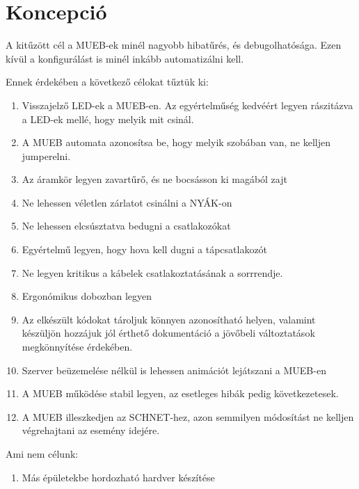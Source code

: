 \chapter{Koncepció}

A kitűzött cél a MUEB-ek minél nagyobb hibatűrés, és debugolhatósága. Ezen kívül a konfigurálást is minél inkább automatizálni kell.
\par
Ennek érdekében a következő célokat tűztük ki:
\begin{enumerate}
 \item Visszajelző LED-ek a MUEB-en. Az egyértelműség kedvéért legyen rászitázva a LED-ek mellé, hogy melyik mit csinál.
 \item A MUEB automata azonosítsa be, hogy melyik szobában van, ne kelljen jumperelni.
 \item Az áramkör legyen zavartűrő, és ne bocsásson ki magából zajt
 \item Ne lehessen véletlen zárlatot csinálni a NYÁK-on
 \item Ne lehessen elcsúsztatva bedugni a csatlakozókat
 \item Egyértelmű legyen, hogy hova kell dugni a tápcsatlakozót
 \item Ne legyen kritikus a kábelek csatlakoztatásának a sorrrendje.
 \item Ergonómikus dobozban legyen
 \item Az elkészült kódokat tároljuk könnyen azonosítható helyen, valamint készüljön hozzájuk jól érthető dokumentáció a jövőbeli változtatások megkönnyítése érdekében.
 \item Szerver beüzemelése nélkül is lehessen animációt lejátszani a MUEB-en
 \item A MUEB működése stabil legyen, az esetleges hibák pedig következetesek.
 \item A MUEB illeszkedjen az SCHNET-hez, azon semmilyen módosítást ne kelljen végrehajtani az esemény idejére.
\end{enumerate}
Ami nem célunk:
\begin{enumerate}
 \item Más épületekbe hordozható hardver készítése
\end{enumerate}
